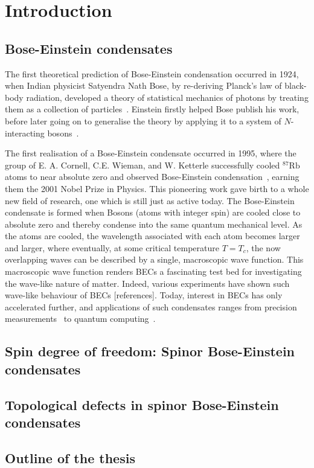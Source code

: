\chapter{Introduction}


\section{Bose-Einstein condensates}
The first theoretical prediction of Bose-Einstein condensation occurred in 1924,
when Indian physicist Satyendra Nath Bose, by re-deriving Planck's law of
black-body radiation, developed a theory of statistical mechanics of photons
by treating them as a collection of particles~\cite{Bose1924}.
Einstein firstly helped Bose publish his work, before later going on to
generalise the theory by applying it to a system of \(N\)-interacting
bosons~\cite{Einstein1925}.

The first realisation of a Bose-Einstein condensate occurred in 1995, where the
group of E. A. Cornell, C.E. Wieman, and W. Ketterle successfully cooled
\( ^{87}\text{Rb}\) atoms to near absolute zero and observed Bose-Einstein
condensation~\cite{Anderson1995}, earning them the 2001 Nobel Prize in Physics.
This pioneering work gave birth to a whole new field of research, one which is
still just as active today.
The Bose-Einstein condensate is formed when Bosons (atoms with integer spin)
are cooled close to absolute zero and thereby condense into the same quantum
mechanical level.
As the atoms are cooled, the wavelength associated with each atom becomes larger
and larger, where eventually, at some critical temperature \(T = T_c\), the
now overlapping waves can be described by a single, macroscopic wave function.
This macroscopic wave function renders BECs a fascinating test bed for
investigating the wave-like nature of matter.
Indeed, various experiments have shown such wave-like behaviour of BECs
    [references].
Today, interest in BECs has only accelerated further, and applications of such
condensates ranges from precision measurements~\cite{Obrecht2007} to
quantum computing~\cite{Byrnes2012}.

\section{Spin degree of freedom: Spinor Bose-Einstein condensates}

\section{Topological defects in spinor Bose-Einstein condensates}

\section{Outline of the thesis}
